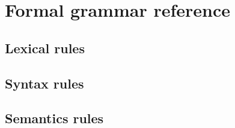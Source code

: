 \chapter{Formal grammar reference}

\section{Lexical rules}

\section{Syntax rules}

\section{Semantics rules}
